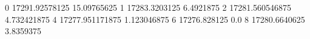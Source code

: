 0 17291.92578125 15.09765625
1 17283.3203125 6.4921875
2 17281.560546875 4.732421875
4 17277.951171875 1.123046875
6 17276.828125 0.0
8 17280.6640625 3.8359375
